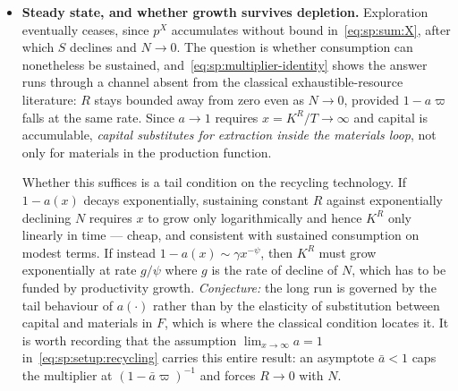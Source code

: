 \begin{itemize}
The capital margin is where we should expect the interesting non-monotonicity. Productivity growth raises $F_K$ as well as $\Psi$, and~\eqref{eq:sp:sum:KR} sets $a'\left(\Psi-p^W+d^Wp^P\right)=F_K\left(1-\zeta\Omega^Y\right)$, so the opportunity cost of putting capital into recycling rises alongside the reward. \emph{Conjecture:} the treatment share $\varpi$ rises early, since it is governed by the cost function $c^T$ alone and responds to $\Psi$ directly, while the capital ratio $K^R/K$ rises only later, once the growth of $\Psi$ outpaces that of $F_K$. Material throughput $R$ would then rise while the multiplier grows faster than $N$ falls, and decline thereafter. \emph{To be checked numerically; the ordering of the two margins is the substantive claim.} Part of the ordering is no longer a conjecture: Proposition~\ref{prop:sp:phases} establishes that $\varpi>0$ always while $K^R=0$ on an interval whenever~\eqref{eq:sp:phases:threshold} holds, so treatment strictly precedes recycling. What remains open is the behaviour of the two margins \emph{after} $t_R$, and whether~\eqref{eq:sp:phases:threshold} can be crossed more than once.

\item \textbf{Steady state, and whether growth survives depletion.} Exploration eventually ceases, since $p^X$ accumulates without bound in~\eqref{eq:sp:sum:X}, after which $S$ declines and $N\to0$. The question is whether consumption can nonetheless be sustained, and~\eqref{eq:sp:multiplier-identity} shows the answer runs through a channel absent from the classical exhaustible-resource literature: $R$ stays bounded away from zero even as $N\to0$, provided $1-a\varpi$ falls at the same rate. Since $a\to1$ requires $x=K^R/T\to\infty$ and capital is accumulable, \emph{capital substitutes for extraction inside the materials loop}, not only for materials in the production function.

Whether this suffices is a tail condition on the recycling technology. If $1-a\left(x\right)$ decays exponentially, sustaining constant $R$ against exponentially declining $N$ requires $x$ to grow only logarithmically and hence $K^R$ only linearly in time --- cheap, and consistent with sustained consumption on modest terms. If instead $1-a\left(x\right)\sim\gamma x^{-\psi}$, then $K^R$ must grow exponentially at rate $g/\psi$ where $g$ is the rate of decline of $N$, which has to be funded by productivity growth. \emph{Conjecture:} the long run is governed by the tail behaviour of $a\left(\cdot\right)$ rather than by the elasticity of substitution between capital and materials in $F$, which is where the classical condition locates it. It is worth recording that the assumption $\lim_{x\to\infty}a=1$ in~\eqref{eq:sp:setup:recycling} carries this entire result: an asymptote $\bar a<1$ caps the multiplier at $\left(1-\bar a\varpi\right)^{-1}$ and forces $R\to0$ with $N$.


\end{itemize}
